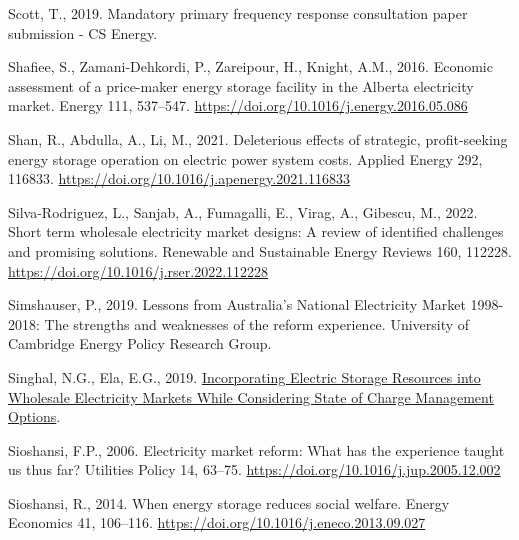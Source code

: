 \documentclass[12pt,a4paper,]{report}
\newlength{\cslhangindent}
\newenvironment{CSLReferences}[2] %
 {%
  \setlength{\parindent}{0pt}
  \ifodd #1 \everypar{\setlength{\hangindent}{\cslhangindent}}\ignorespaces\fi
  \ifnum #2 > 0
  \setlength{\parskip}{#2\baselineskip}
  \fi
 }%
 {}
\begin{document}
\begin{CSLReferences}{1}{0}
\leavevmode{}%
Scott, T., 2019. Mandatory primary frequency response consultation paper
submission - {CS Energy}.

\leavevmode{}%
Shafiee, S., Zamani-Dehkordi, P., Zareipour, H., Knight, A.M., 2016.
Economic assessment of a price-maker energy storage facility in the
{Alberta} electricity market. Energy 111, 537--547.
\url{https://doi.org/10.1016/j.energy.2016.05.086}

\leavevmode{}%
Shan, R., Abdulla, A., Li, M., 2021. Deleterious effects of strategic,
profit-seeking energy storage operation on electric power system costs.
Applied Energy 292, 116833.
\url{https://doi.org/10.1016/j.apenergy.2021.116833}

\leavevmode{}%
Silva-Rodriguez, L., Sanjab, A., Fumagalli, E., Virag, A., Gibescu, M.,
2022. Short term wholesale electricity market designs: {A} review of
identified challenges and promising solutions. Renewable and Sustainable
Energy Reviews 160, 112228.
\url{https://doi.org/10.1016/j.rser.2022.112228}

\leavevmode{}%
Simshauser, P., 2019. Lessons from {Australia}'s {National Electricity
Market} 1998-2018: The strengths and weaknesses of the reform
experience. {University of Cambridge Energy Policy Research Group}.

\leavevmode{}%
Singhal, N.G., Ela, E.G., 2019.
\href{https://cigre-usnc.org/wp-content/uploads/2019/11/3.-GOTF-11042019_EPRI-NS.pdf}{Incorporating
{Electric Storage Resources} into {Wholesale Electricity Markets While
Considering State} of {Charge Management Options}}.

\leavevmode{}%
Sioshansi, F.P., 2006. Electricity market reform: {What} has the
experience taught us thus far? Utilities Policy 14, 63--75.
\url{https://doi.org/10.1016/j.jup.2005.12.002}

\leavevmode{}%
Sioshansi, R., 2014. When energy storage reduces social welfare. Energy
Economics 41, 106--116.
\url{https://doi.org/10.1016/j.eneco.2013.09.027}


\end{CSLReferences}
\end{document}
